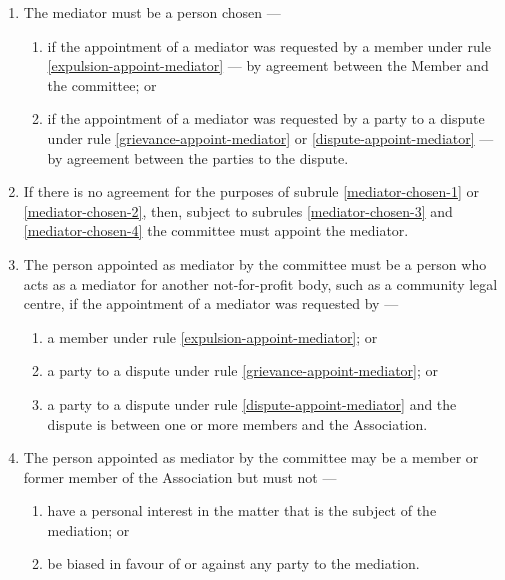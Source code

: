 \documentclass[../constitution.tex]{subfiles}
\begin{document}
\begin{enumerate}
\item The mediator must be a person chosen ---

  \begin{enumerate}
  
  \item if the appointment of a mediator was requested by a member under rule \ref{expulsion-appoint-mediator} --- by agreement between the Member and the committee; or \label{mediator-chosen-1}
  \item if the appointment of a mediator was requested by a party to a dispute under rule \ref{grievance-appoint-mediator} or \ref{dispute-appoint-mediator} --- by agreement between the parties to the dispute. \label{mediator-chosen-2}
  \end{enumerate}
\item If there is no agreement for the purposes of subrule \ref{mediator-chosen-1} or \ref{mediator-chosen-2}, then, subject to subrules \ref{mediator-chosen-3} and \ref{mediator-chosen-4} the committee must appoint the mediator.
\item The person appointed as mediator by the committee must be a person who acts as a mediator for another not-for-profit body, such as a community legal centre, if the appointment of a mediator was requested by --- \label{mediator-chosen-3}

  \begin{enumerate}
  
  \item a member under rule \ref{expulsion-appoint-mediator}; or
  \item a party to a dispute under rule \ref{grievance-appoint-mediator}; or
  \item a party to a dispute under rule \ref{dispute-appoint-mediator} and the dispute is between one or more members and the Association.
  \end{enumerate}
\item The person appointed as mediator by the committee may be a member or former member of the Association but must not --- \label{mediator-chosen-4}

  \begin{enumerate}
  
  \item have a personal interest in the matter that is the subject of the mediation; or
  \item be biased in favour of or against any party to the mediation.
  \end{enumerate}
\end{enumerate}
\end{document}

